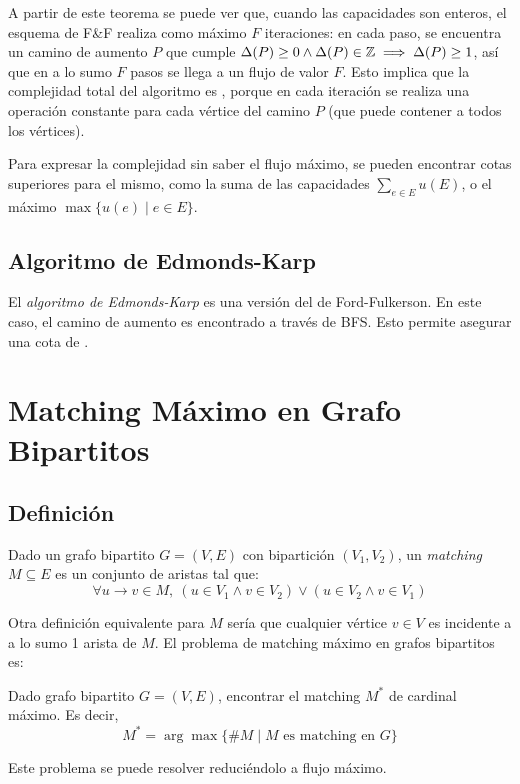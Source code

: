 A partir de este teorema se puede ver que, cuando las capacidades son enteros, el esquema de F\&F realiza como máximo $F$ iteraciones: en cada paso, se encuentra un camino de aumento $P$ que cumple $\Delta(P) \geq 0 \land \Delta(P) \in \mathbb{Z} \implies \Delta(P) \geq 1$, así que en a lo sumo $F$ pasos se llega a un flujo de valor $F$. Esto implica que la complejidad total del algoritmo es , porque en cada iteración se realiza una operación constante para cada vértice del camino $P$ (que puede contener a todos los vértices).

Para expresar la complejidad sin saber el flujo máximo, se pueden encontrar cotas superiores para el mismo, como la suma de las capacidades $\sum_{e \in E} u(E)$, o el máximo $\max{\{u(e) \mid e \in E\}}$.

\subsection{Algoritmo de Edmonds-Karp}
\label{edmonds-karp}

El \textit{algoritmo de Edmonds-Karp} es una versión del de Ford-Fulkerson. En este caso, el camino de aumento es encontrado a través de BFS. Esto permite asegurar una cota de .

\section{Matching Máximo en Grafo Bipartitos}

\subsection{Definición}

Dado un grafo bipartito $G = (V, E)$ con bipartición $(V_1, V_2)$, un \textit{matching} $M \subseteq E$ es un conjunto de aristas tal que:
$$\forall u \rightarrow v \in M,\ (u \in V_1 \land v \in V_2) \lor (u \in V_2 \land v \in V_1)$$

Otra definición equivalente para $M$ sería que cualquier vértice $v \in V$ es incidente a a lo sumo 1 arista de $M$. El problema de matching máximo en grafos bipartitos es:

\begin{problema}
    Dado grafo bipartito $G = (V, E)$, encontrar el matching $M^*$ de cardinal máximo. Es decir,
    $$M^* = \arg\max{\{\#M \mid M \text{ es matching en } G\}}$$
\end{problema}

Este problema se puede resolver reduciéndolo a flujo máximo.

